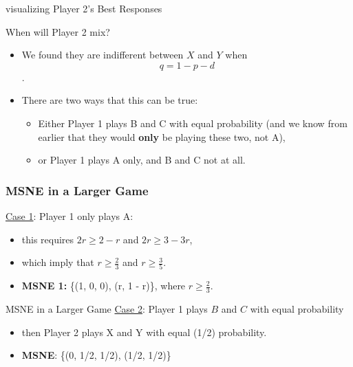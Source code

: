 \begin{frame}{visualizing Player 2's Best Responses}
  \begin{center}
  \end{center}
\end{frame}


\begin{frame}{When will Player 2 mix?}
  \begin{itemize}
    \item We found they are indifferent between $X$ and $Y$ when 
    $$ q = 1 - p - d $$.

	  \item There are two ways that this can be true: 
    \begin{itemize}
      \item Either Player 1 plays B and C with equal probability
      (and we know from earlier that they would \textbf{only} be playing these two, not A),
      \item or Player 1 plays A only, and B and C not at all. 
    \end{itemize}
  \end{itemize}
\end{frame}


\begin{frame}
\frametitle{MSNE in a Larger Game}
\underline{Case 1}: Player 1 only plays A:
\begin{itemize}
  \item this requires $2r \geq 2 - r$ and $2r \geq 3 - 3r$,
  \item which imply that $r \geq \frac{2}{3}$ and $r \geq \frac{3}{5}$.
  \item \textbf{MSNE 1:} \{(1, 0, 0), (r, 1 - r)\}, where $r \geq \frac{2}{3}$.
	\end{itemize}
\end{frame}


\begin{frame}{MSNE in a Larger Game}
\underline{Case 2}: Player 1 plays $B$ and $C$ with equal probability 
  \begin{itemize}
   \item then Player 2 plays X and Y with equal (1/2) probability.
    \item \textbf{MSNE}: \{(0, 1/2, 1/2), (1/2, 1/2)\}
  \end{itemize} 
\end{frame}

